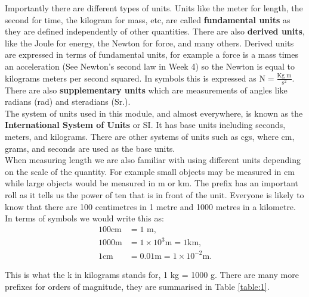 \documentclass[a4paper,12pt]{book}
\begin{document}
Importantly there are different types of units. Units like the meter for length, the second for time, the kilogram for mass, etc, are called \textbf{fundamental units} as they are defined independently of other quantities.  There are also \textbf{derived units}, like the Joule for energy, the Newton for force, and many others. Derived units are expressed in terms of fundamental units, for example a force is a mass times an acceleration (See Newton's second law in Week 4) so the Newton is equal to kilograms meters per second squared. In symbols this is expressed as $\text{N}=\frac{\text{Kg m}}{\text{s}^{2}}$.\\

There are also \textbf{supplementary units} which are measurements of angles like radians (rad) and steradians (Sr.).\\

The system of units used in this module, and almost everywhere, is known as the \textbf{International System of Units} or SI. It has base units including seconds, meters, and kilograms. There are other systems of units such as cgs, where cm, grams, and seconds are used as the base units.\\

When measuring length we are also familiar with using different units depending on the scale of the quantity. For example small objects may be measured in cm while large objects would be measured in m or km. The prefix has an important roll as it tells us the power of ten that is in front of the unit. Everyone is likely to know that there are 100 centimetres in 1 metre and 1000 metres in a kilometre. In terms of symbols we would write this as:
\begin{align*}
    100 \text{cm} &=1 \text{ m},\\
    1000 \text{m} &= 1\times 10^{3} \text{m} = 1 \text{km},\\
    1 \text{cm} &= 0.01 \text{m} = 1\times 10^{-2} \text{m}.
\end{align*}

This is what the k in kilograms stands for, 1 kg = 1000 g. There are many more prefixes for orders of magnitude, they are summarised in Table \cref{table:1}.
\end{document}
